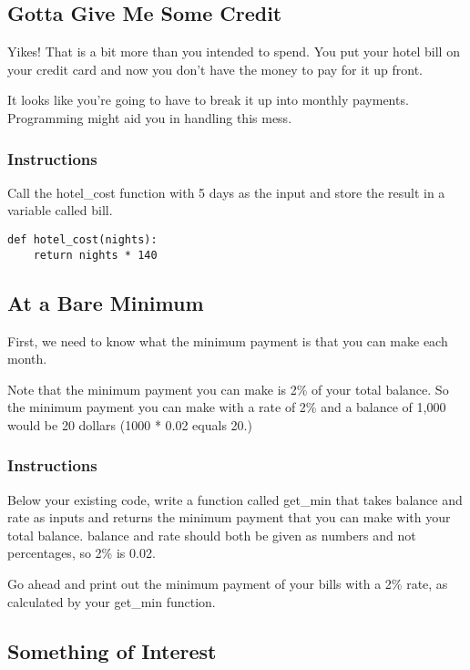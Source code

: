 \documentclass[12pt,a4paper,final,twoside,onecolumn,titlepage]{book}
\begin{document}
\subsection{Gotta Give Me Some Credit}

Yikes! That is a bit more than you intended to spend. You put your hotel bill on your credit card and now you don't have the money to pay for it up front.

It looks like you're going to have to break it up into monthly payments. Programming might aid you in handling this mess.
\subsubsection{Instructions}

Call the hotel\_cost function with 5 days as the input and store the result in a variable called bill.

\begin{lstlisting}
def hotel_cost(nights):
    return nights * 140

\end{lstlisting}

\subsection{At a Bare Minimum}

First, we need to know what the minimum payment is that you can make each month.

Note that the minimum payment you can make is 2\% of your total balance. So the minimum payment you can make with a rate of 2\% and a balance of 1,000 would be 20 dollars (1000 * 0.02 equals 20.)
\subsubsection{Instructions}

Below your existing code, write a function called get\_min that takes balance and rate as inputs and returns the minimum payment that you can make with your total balance. balance and rate should both be given as numbers and not percentages, so 2\% is 0.02.

Go ahead and print out the minimum payment of your bills with a 2\% rate, as calculated by your get\_min function.

\subsection{Something of Interest}
\end{document}

